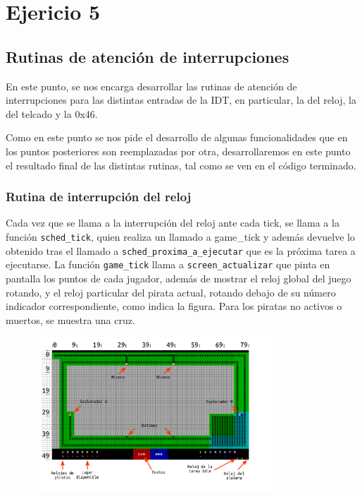 \section{Ejericio 5}
\subsection{Rutinas de atención de interrupciones}

En este punto, se nos encarga desarrollar las rutinas de atención de interrupciones para las distintas entradas de la IDT, en particular, la del reloj, la del telcado y la 0x46.

Como en este punto se nos pide el desarrollo de algunas funcionalidades que en los puntos posteriores son reemplazadas por otra, desarrollaremos en este punto el resultado final de las distintas rutinas, tal como se ven en el código terminado.

\subsubsection{Rutina de interrupción del reloj}

Cada vez que se llama a la interrupción del reloj ante cada tick, se llama a la función \texttt{sched\_tick}, quien realiza un llamado a game\_tick y además devuelve lo obtenido tras el llamado a \texttt{sched\_proxima\_a\_ejecutar} que es la próxima tarea a ejecutarse.
La función \texttt{game\_tick} llama a \texttt{screen\_actualizar} que pinta en pantalla los puntos de cada jugador, además de mostrar el reloj global del juego rotando, y el reloj particular del pirata actual, rotando debajo de su número indicador correspondiente, como indica la figura. Para los piratas no activos o muertos, se muestra una cruz.


\begin{figure}[ht]
\centering
\includegraphics[width=90mm]{ej_5/img_ej_5.png}
\end{figure}


